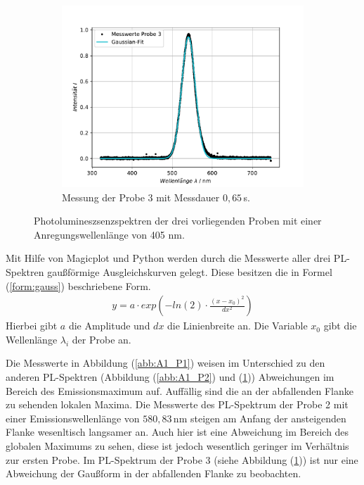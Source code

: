 \begin{figure}[H]
\begin{subfigure}[t]{0.4\textwidth}
	\includegraphics[width=\textwidth]{Plots/aufgabe1a_P3.pdf}
	\caption{Messung der Probe 3 mit Messdauer $0,65 \,$s.}
	\label{abb:A1_P3}
	\end{subfigure}
\caption{Photolumineszsenzspektren der drei vorliegenden Proben mit einer Anregungswellenl\"{a}nge von 405 nm.}
\label{abb:auf1a}
\end{figure}
Mit Hilfe von Magicplot und Python werden durch die Messwerte aller drei PL-Spektren gau{\ss}f\"{o}rmige Ausgleichs{\-}kur{\-}ven gelegt.
Diese besitzen die in Formel (\ref{form:gauss}) beschriebene Form.
\begin{align}
	y = a \cdot exp \left( -ln(2) \cdot \frac{(x-x_0)^2}{dx^2} \right)
\label{form:gauss}
\end{align}
Hierbei gibt $a$ die Amplitude und $dx$ die Linienbreite an.
Die Variable $x_0$ gibt die Wellenl\"{a}nge $\lambda_i$ der Probe an.

Die Messwerte in Abbildung (\ref{abb:A1_P1}) weisen im Unterschied zu den anderen PL-Spektren (Abbildung (\ref{abb:A1_P2}) und (\ref{abb:A1_P3})) Abweichungen im Bereich des Emissionsmaximum auf.
Auff\"{a}llig sind die an der abfallenden Flanke zu sehenden lokalen Maxima.
Die Messwerte des PL-Spektrum der Probe 2 mit einer Emissionswellenl\"{a}nge von $580,83 \,$nm steigen am Anfang der ansteigenden Flanke wesenltisch langsamer an.
Auch hier ist eine Abweichung im Bereich des globalen Maximums zu sehen, diese ist jedoch wesentlich geringer im Verh\"{a}ltnis zur ersten Probe.
Im PL-Spektrum der Probe 3 (siehe Abbildung (\ref{abb:A1_P3})) ist nur eine Abweichung der Gau{\ss}form in der abfallenden Flanke zu beobachten.

